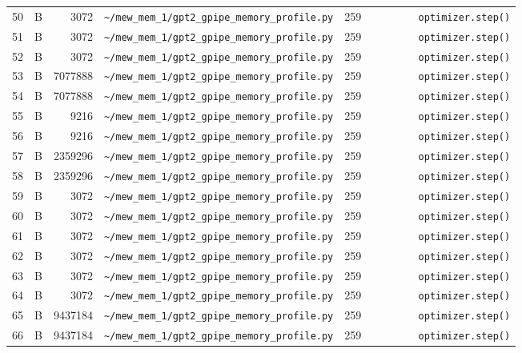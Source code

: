 \documentclass{article}
\begin{document}
\begin{longtable}{r l r p{6.5cm} r p{7.0cm}}
50 & B & 3072 & \lstinline|~/mew_mem_1/gpt2_gpipe_memory_profile.py| & 259 & \lstinline|        optimizer.step()| \\
51 & B & 3072 & \lstinline|~/mew_mem_1/gpt2_gpipe_memory_profile.py| & 259 & \lstinline|        optimizer.step()| \\
52 & B & 3072 & \lstinline|~/mew_mem_1/gpt2_gpipe_memory_profile.py| & 259 & \lstinline|        optimizer.step()| \\
53 & B & 7077888 & \lstinline|~/mew_mem_1/gpt2_gpipe_memory_profile.py| & 259 & \lstinline|        optimizer.step()| \\
54 & B & 7077888 & \lstinline|~/mew_mem_1/gpt2_gpipe_memory_profile.py| & 259 & \lstinline|        optimizer.step()| \\
55 & B & 9216 & \lstinline|~/mew_mem_1/gpt2_gpipe_memory_profile.py| & 259 & \lstinline|        optimizer.step()| \\
56 & B & 9216 & \lstinline|~/mew_mem_1/gpt2_gpipe_memory_profile.py| & 259 & \lstinline|        optimizer.step()| \\
57 & B & 2359296 & \lstinline|~/mew_mem_1/gpt2_gpipe_memory_profile.py| & 259 & \lstinline|        optimizer.step()| \\
58 & B & 2359296 & \lstinline|~/mew_mem_1/gpt2_gpipe_memory_profile.py| & 259 & \lstinline|        optimizer.step()| \\
59 & B & 3072 & \lstinline|~/mew_mem_1/gpt2_gpipe_memory_profile.py| & 259 & \lstinline|        optimizer.step()| \\
60 & B & 3072 & \lstinline|~/mew_mem_1/gpt2_gpipe_memory_profile.py| & 259 & \lstinline|        optimizer.step()| \\
61 & B & 3072 & \lstinline|~/mew_mem_1/gpt2_gpipe_memory_profile.py| & 259 & \lstinline|        optimizer.step()| \\
62 & B & 3072 & \lstinline|~/mew_mem_1/gpt2_gpipe_memory_profile.py| & 259 & \lstinline|        optimizer.step()| \\
63 & B & 3072 & \lstinline|~/mew_mem_1/gpt2_gpipe_memory_profile.py| & 259 & \lstinline|        optimizer.step()| \\
64 & B & 3072 & \lstinline|~/mew_mem_1/gpt2_gpipe_memory_profile.py| & 259 & \lstinline|        optimizer.step()| \\
65 & B & 9437184 & \lstinline|~/mew_mem_1/gpt2_gpipe_memory_profile.py| & 259 & \lstinline|        optimizer.step()| \\
66 & B & 9437184 & \lstinline|~/mew_mem_1/gpt2_gpipe_memory_profile.py| & 259 & \lstinline|        optimizer.step()| \\

\end{longtable}
\end{document}

